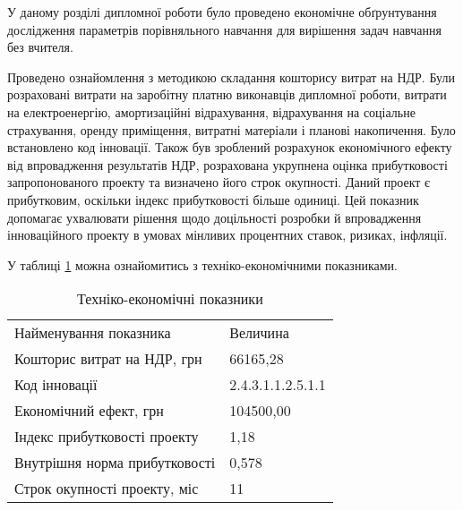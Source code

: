 У даному розділі дипломної роботи було проведено економічне обґрунтування дослідження параметрів порівняльного навчання для вирішення задач навчання без вчителя.

Проведено ознайомлення з методикою складання кошторису витрат на НДР. Були розраховані витрати на заробітну платню виконавців дипломної роботи, витрати на електроенергію, амортизаційні відрахування, відрахування на соціальне страхування, оренду приміщення, витратні матеріали і планові накопичення. Було встановлено код інновації. Також був зроблений розрахунок економічного ефекту від впровадження результатів НДР, розрахована укрупнена оцінка прибутковості запропонованого проекту та визначено його строк окупності. Даний проект є прибутковим, оскільки індекс прибутковості більше одиниці. Цей показник допомагає ухвалювати рішення щодо доцільності розробки й впровадження інноваційного проекту в умовах мінливих процентних ставок, ризиках, інфляції.

У таблиці \ref{tab:summary} можна ознайомитись з техніко-економічними показниками.

\begin{table}[h!]
	\captionstyle{ \raggedright}
	\caption{Техніко-економічні показники}\label{tab:summary}
	\begin{tabular}{| p{} | p{} |} 
		\hline
		Найменування показника & Величина \\
		\hlinewd{2pt}
		Кошторис витрат на НДР, грн & 66165,28 \\
		\hline
		Код інновації & 2.4.3.1.1.2.5.1.1 \\
		\hline
		Економічний ефект, грн & 104500,00 \\
		\hline
		Індекс прибутковості проекту & 1,18 \\
		\hline
		Внутрішня норма прибутковості & 0,578 \\
		\hline
		Строк окупності проекту, міс & 11 \\
		\hline
	\end{tabular}
\end{table}

